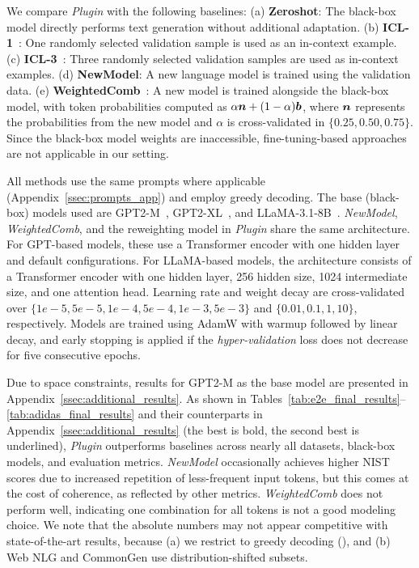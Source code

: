 We compare \textit{Plugin} with the following baselines:  
(a) \textbf{Zeroshot}: The black-box model directly performs text generation without additional adaptation.  
(b) \textbf{ICL-1}~\citep{long2023adapt}: One randomly selected validation sample is used as an in-context example.  
(c) \textbf{ICL-3}~\citep{long2023adapt}: Three randomly selected validation samples are used as in-context examples.  
(d) \textbf{NewModel}: A new language model is trained using the validation data.  
(e) \textbf{WeightedComb}~\citep{liu2021dexperts}: A new model is trained alongside the black-box model, with token probabilities computed as $\alpha \bm{n} + (1-\alpha)\bm{b}$, where $\bm{n}$ represents the probabilities from the new model and $\alpha$ is cross-validated in $\{0.25, 0.50, 0.75\}$. Since the black-box model weights are inaccessible, fine-tuning-based approaches are not applicable in our setting.

All methods use the same prompts where applicable (Appendix~\ref{ssec:prompts_app}) and employ greedy decoding. The base (black-box) models used are GPT2-M~\citep{radford2019language}, GPT2-XL~\citep{radford2019language}, and LLaMA-3.1-8B~\citep{dubey2024llama}. \textit{NewModel}, \textit{WeightedComb}, and the reweighting model in \textit{Plugin} share the same architecture. For GPT-based models, these use a Transformer encoder with one hidden layer and default configurations. For LLaMA-based models, the architecture consists of a Transformer encoder with one hidden layer, 256 hidden size, 1024 intermediate size, and one attention head. Learning rate and weight decay are cross-validated over $\{1e-5, 5e-5, 1e-4, 5e-4, 1e-3, 5e-3\}$ and $\{0.01, 0.1, 1, 10\}$, respectively. Models are trained using AdamW with warmup followed by linear decay, and early stopping is applied if the \textit{hyper-validation} loss does not decrease for five consecutive epochs. 

Due to space constraints, results for GPT2-M as the base model are presented in Appendix~\ref{ssec:additional_results}. As shown in Tables~\ref{tab:e2e_final_results}–\ref{tab:adidas_final_results} and their counterparts in Appendix~\ref{ssec:additional_results} (the best is bold, the second best is underlined), \textit{Plugin} outperforms baselines across nearly all datasets, black-box models, and evaluation metrics.  \textit{NewModel} occasionally achieves higher NIST scores due to increased repetition of less-frequent input tokens, but this comes at the cost of coherence, as reflected by other metrics. \textit{WeightedComb} does not perform well,  indicating one combination for all tokens is not a good modeling choice. We note that the absolute numbers may not appear competitive with state-of-the-art results, because (a) we restrict to greedy decoding (), and (b) Web NLG and CommonGen use distribution-shifted subsets.


